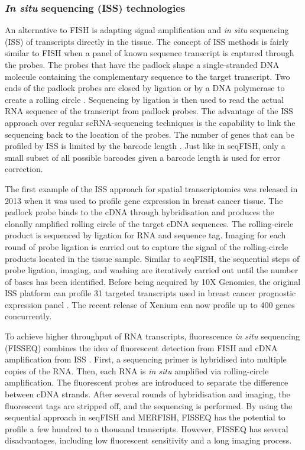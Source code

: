\subsubsection{\textit{In situ} sequencing (ISS) technologies}
An alternative to FISH is adapting signal amplification and \textit{in situ} sequencing (ISS) of transcripts directly in the tissue. The concept of ISS methods is fairly similar to FISH when a panel of known sequence transcript is captured through the probes. The probes that have the padlock shape a single-stranded DNA molecule containing the complementary sequence to the target transcript. Two ends of the padlock probes are closed by ligation or by a DNA polymerase to create a rolling circle \cite{conrad2022single}. Sequencing by ligation is then used to read the actual RNA sequence of the transcript from padlock probes. The advantage of the ISS approach over regular scRNA-sequencing techniques is the capability to link the sequencing back to the location of the probes. The number of genes that can be profiled by ISS is limited by the barcode length \cite{williams2022introduction, asp2020spatially}. Just like in seqFISH, only a small subset of all possible barcodes given a barcode length is used for error correction.

The first example of the ISS approach for spatial transcriptomics was released in 2013 when it was used to profile gene expression in breast cancer tissue. The padlock probe binds to the cDNA through hybridisation and produces the  clonally amplified rolling circle of the target cDNA sequences. The rolling-circle product is sequenced by ligation for RNA and sequence tag. Imaging for each round of probe ligation is carried out to capture the signal of the rolling-circle products located in the tissue sample. Similar to seqFISH, the sequential steps of probe ligation, imaging, and washing are iteratively carried out until the number of bases has been identified. Before being acquired by 10X Genomics, the original ISS platform can profile 31 targeted transcripts used in breast cancer prognostic expression panel \cite{ke2013situ}. The recent release of Xenium can now profile up to 400 genes concurrently. 

To achieve higher throughput of RNA transcripts, fluorescence \textit{in situ} sequencing (FISSEQ) combines the idea of fluorescent detection from FISH and cDNA amplification from ISS \cite{lee2015fluorescent}. First, a sequencing primer is hybridised into multiple copies of the RNA. Then, each RNA is \textit{in situ} amplified via rolling-circle amplification. The fluorescent probes are introduced to separate the difference between cDNA strands. After several rounds of hybridisation and imaging, the fluorescent tags are stripped off, and the sequencing is performed. By using the sequential approach in seqFISH and MERFISH, FISSEQ has the potential to profile a few hundred to a thousand transcripts. However, FISSEQ has several disadvantages, including low fluorescent sensitivity and a long imaging process.  

